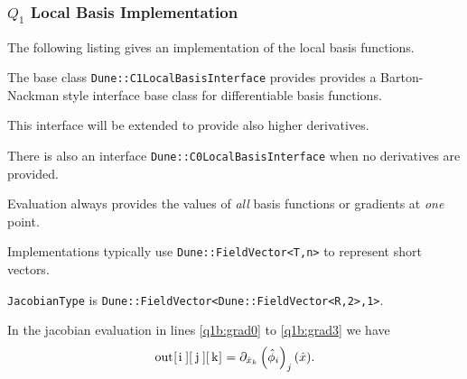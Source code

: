 \begin{frame}
\end{frame}

\begin{frame}[fragile]
\frametitle<presentation>{$Q_1$ Local Basis Implementation}
The following listing gives an implementation of the local basis
functions. 

The base class \lstinline{Dune::C1LocalBasisInterface} provides
provides a Barton-Nackman style interface base class for
differentiable basis functions.

This interface will be extended to provide also higher derivatives.

There is also an interface \lstinline{Dune::C0LocalBasisInterface}
when no derivatives are provided.

Evaluation always provides the values of \textit{all} basis functions
or gradients at \textit{one} point. 

Implementations typically use \lstinline{Dune::FieldVector<T,n>} to
represent short vectors.

\lstinline{JacobianType} is \lstinline{Dune::FieldVector<Dune::FieldVector<R,2>,1>}.

In the jacobian evaluation in lines \ref{q1b:grad0} to \ref{q1b:grad3}
we have
\begin{equation*}
\text{\lstinline{out[i][j][k]}}
= \partial_{\hat{x}_k} \left(\hat\phi_i\right)_j (\hat{x}) . 
\end{equation*}
\end{frame}


